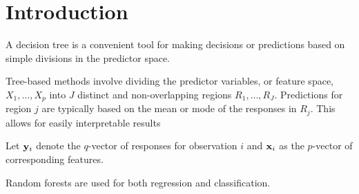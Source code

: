 \section{Introduction} %

A decision tree is a convenient tool for making decisions or predictions based on simple divisions in the predictor space. 

Tree-based methods involve dividing the predictor variables, or feature space, $X_1,\ldots,X_p$ into $J$ distinct and non-overlapping regions $R_1,\ldots,R_J$. Predictions for region $j$ are typically based on the mean or mode of the responses in $R_j$. This allows for easily interpretable results

Let $\mathbf{\bm{y}}_i$ denote the $q$-vector of responses for observation $i$ and $\mathbf{\bm{x}}_i$ as the $p$-vector of corresponding features.

Random forests are used for both regression and classification.

